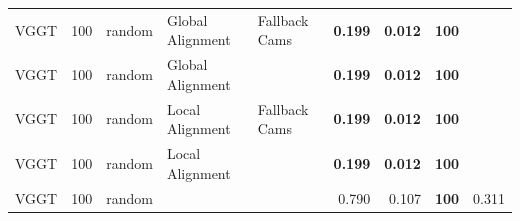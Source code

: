 \begin{table}[H]
\begin{tabular}{lrlllrrrr}
VGGT & 100 & random & Global Alignment & Fallback Cams & \textbf{0.199} & \textbf{0.012} & \textbf{100} &  \\
VGGT & 100 & random & Global Alignment &  & \textbf{0.199} & \textbf{0.012} & \textbf{100} &  \\
VGGT & 100 & random & Local Alignment & Fallback Cams & \textbf{0.199} & \textbf{0.012} & \textbf{100} &  \\
VGGT & 100 & random & Local Alignment &  & \textbf{0.199} & \textbf{0.012} & \textbf{100} &  \\
VGGT & 100 & random &  &  & 0.790 & 0.107 & \textbf{100} & 0.311 \\
\bottomrule
\end{tabular}
\end{table}
